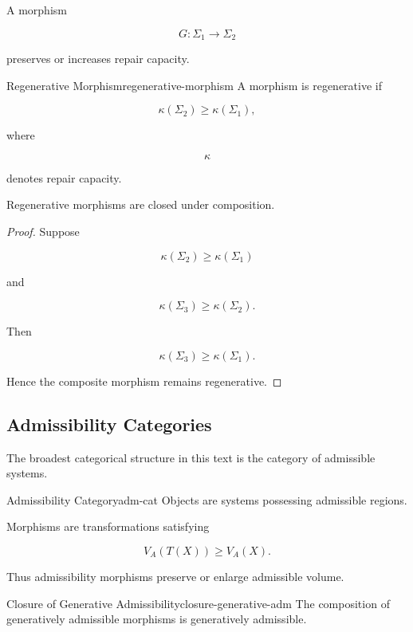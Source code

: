 \documentclass[12pt,twoside,openright]{book}
\newenvironment{prop}
{\begin{proposition}{}{}}
{\end{proposition}}
\begin{document}
A morphism

\[
G:\Sigma_1\rightarrow\Sigma_2
\]

preserves or increases repair capacity.

\begin{definition}{Regenerative Morphism}{regenerative-morphism}
A morphism is regenerative if

\[
\kappa(\Sigma_2)
\ge
\kappa(\Sigma_1),
\]

where

\[
\kappa
\]

denotes repair capacity.
\end{definition}

\begin{prop}
Regenerative morphisms are closed under composition.
\end{prop}

\begin{proof}
Suppose

\[
\kappa(\Sigma_2)
\ge
\kappa(\Sigma_1)
\]

and

\[
\kappa(\Sigma_3)
\ge
\kappa(\Sigma_2).
\]

Then

\[
\kappa(\Sigma_3)
\ge
\kappa(\Sigma_1).
\]

Hence the composite morphism remains regenerative.
\end{proof}

\subsection{Admissibility Categories}

The broadest categorical structure in this text is the
category of admissible systems.

\begin{definition}{Admissibility Category}{adm-cat}
Objects are systems possessing admissible regions.

Morphisms are transformations satisfying

\[
V_A(T(X))
\ge
V_A(X).
\]
\end{definition}

Thus admissibility morphisms preserve or enlarge
admissible volume.

\begin{theorem}{Closure of Generative Admissibility}{closure-generative-adm}
The composition of generatively admissible morphisms is
generatively admissible.
\end{theorem}
\end{document}
